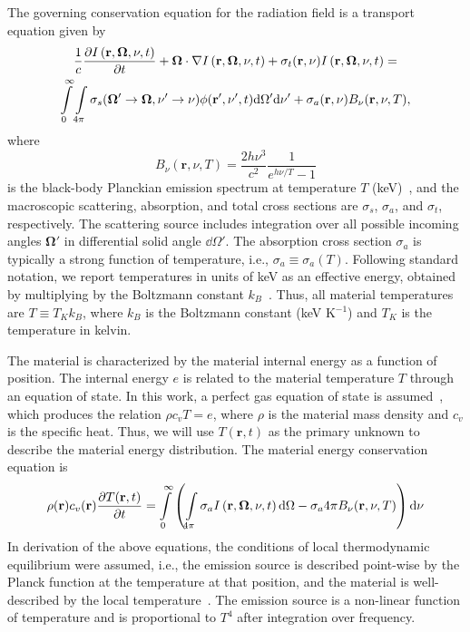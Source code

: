 The governing conservation equation for the radiation field is a transport equation given
by~\cite{mihalas,lewis,wollaber_thesis}
 \begin{multline}
     \frac{1}{c} \frac{\partial I\left(\mathbf{r},\mathbf{\Omega},\nu,t\right)}{\partial t} + \mathbf{\Omega}\cdot \nabla I \left(\mathbf{r},\mathbf{\Omega},\nu,t\right) + \sigma_t
     (\mathbf{r},\nu) I \left(\mathbf{r},\mathbf{\Omega},\nu,t\right) = \\ \int \limits_0^\infty \int \limits_{4\pi}
     \sigma_s(\mathbf{\Omega'} \rightarrow \mathbf{\Omega},\nu'\rightarrow\nu)
     \phi(\mathbf{r}',\nu',t) \mathrm{d} \Omega' \mathrm{d} \nu' +
     \sigma_a(\mathbf{r},\nu)B_\nu(\mathbf{r},\nu,T),
 \end{multline}
where
\begin{equation}
    B_\nu(\mathbf{r},\nu,T) = \frac{2 h \nu^3}{c^2} \frac{1}{e^{h\nu/T} - 1}
\end{equation}
is the black-body Planckian emission
spectrum at temperature $T$ (keV)~\cite{mihalas}, and the macroscopic scattering, absorption, and total cross sections are $\sigma_s$,
$\sigma_a$, and $\sigma_t$, respectively. 
 The scattering source includes
integration over all possible incoming angles $\mathbf\Omega'$ in differential
solid angle $\dd \Omega'$.  The absorption cross section $\sigma_a$ is typically
a strong function of temperature, i.e., $\sigma_a\equiv \sigma_a(T)$.  Following standard notation, we
report temperatures in units of keV as an effective energy, obtained by multiplying by the Boltzmann
constant $k_B$~\cite{mihalas}.  Thus, all material temperatures are $T \equiv T_{K}
k_B$, where $k_B$ is the Boltzmann constant (keV K$^{-1}$) and $T_{K}$ is the temperature
in kelvin.

The material is characterized by the material internal
energy as a function of position.  The internal energy $e$ is related to the material
temperature $T$ through an equation of state.   In this work, a perfect gas equation of state is
assumed~\cite{toro}, which produces the relation $\rho c_v T = e$, where $\rho$ is the
material mass density and $c_v$ is the specific heat.  Thus, we will use $T(\mathbf{r},t)$ as the
primary unknown to describe the material energy distribution.  The material energy conservation equation is
\begin{equation}
    \rho(\mathbf{r}) c_v(\mathbf{r}) \frac{\partial T(\mathbf{r},t)}{\partial t} = \int\limits_0^\infty
    \left( \int\limits_{4\pi} \sigma_a I \left(\mathbf{r},\mathbf{\Omega},\nu,t\right) \mathrm{d} \Omega - \sigma_a 4\pi B_\nu(\mathbf{r},\nu,T) \right) \mathrm{d} \nu
 \end{equation}
 In derivation of the above equations, the conditions of local thermodynamic equilibrium
were assumed, i.e., the emission source is described point-wise by the
Planck function at the temperature at that position, and the material is well-described by
the local temperature~\cite{mihalas,wollaber_thesis}. The emission source is a non-linear function of temperature and is
proportional to $T^4$ after integration over frequency.  

